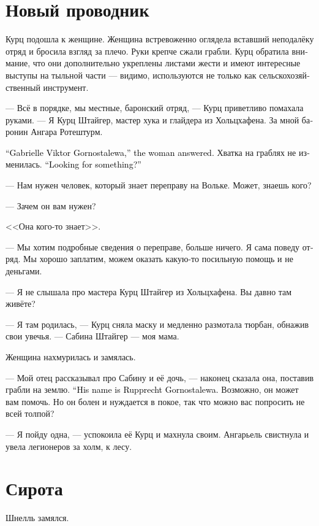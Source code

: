 \documentclass[a4paper,12pt,fleqn]{book}\usepackage{cooltooltips}\usepackage{polyglossia}\setdefaultlanguage[babelshorthands=true]{russian}\setotherlanguage{english}\defaultfontfeatures{Ligatures=TeX,Mapping=tex-text} \usepackage{xcolor}\definecolor{lightgray}{HTML}{bbbbbb}\color{lightgray}\newcommand{\ml}[3]{\textenglish{\textcolor{black}{#3}}}
\begin{document}
\section{Новый проводник}

Курц подошла к женщине.
Женщина встревоженно оглядела вставший неподалёку отряд и бросила взгляд за плечо.
Руки крепче сжали грабли.
Курц обратила внимание, что они дополнительно укреплены листами жести и имеют интересные выступы на тыльной части --- видимо, используются не только как сельскохозяйственный инструмент.

--- Всё в порядке, мы местные, баронский отряд, --- Курц приветливо помахала руками.
--- Я Курц Штайгер, мастер хука и глайдера из Хольцхафена.
За мной баронин Ангара Ротештурм.

\ml{$0$}
{--- Габриэль Виктор Горносталева, --- представилась женщина.}
{``Gabrielle Viktor Gornostalewa,'' the woman answered.}
Хватка на граблях не изменилась.
\ml{$0$}
{--- Вы что-то ищете?}
{``Looking for something?''}

--- Нам нужен человек, который знает переправу на Вольке.
Может, знаешь кого?

--- Зачем он вам нужен?

<<Она кого-то знает>>.

--- Мы хотим подробные сведения о переправе, больше ничего.
Я сама поведу отряд.
Мы хорошо заплатим, можем оказать какую-то посильную помощь и не деньгами.

--- Я не слышала про мастера Курц Штайгер из Хольцхафена.
Вы давно там живёте?

--- Я там родилась, --- Курц сняла маску и медленно размотала тюрбан, обнажив свои увечья.
--- Сабина Штайгер --- моя мама.

Женщина нахмурилась и замялась.

--- Мой отец рассказывал про Сабину и её дочь, --- наконец сказала она, поставив грабли на землю.
\ml{$0$}
{--- Его зовут Руппрехт Горносталева.}
{``His name is Rupprecht Gornostalewa.}
Возможно, он может вам помочь.
Но он болен и нуждается в покое, так что можно вас попросить не всей толпой?

--- Я пойду одна, --- успокоила её Курц и махнула своим.
Ангарьель свистнула и увела легионеров за холм, к лесу.

\section{Сирота}

Шнелль замялся.
\end{document}
